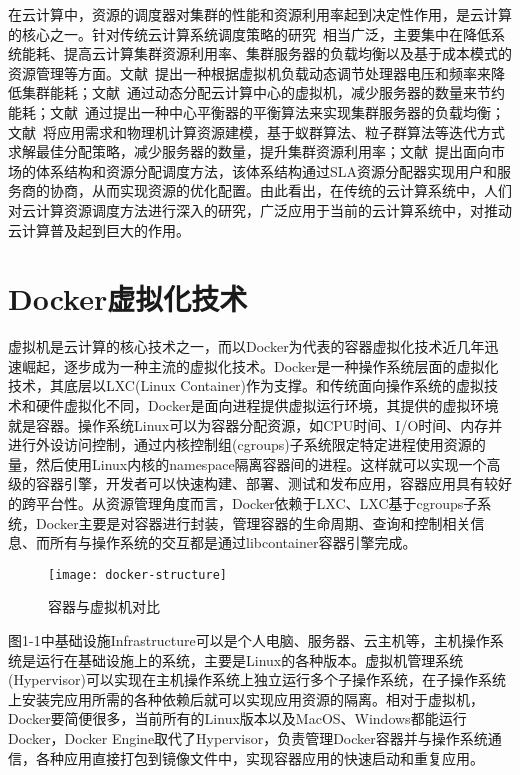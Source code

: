 在云计算中，资源的调度器对集群的性能和资源利用率起到决定性作用，是云计算的核心之一。针对传统云计算系统调度策略的研究~\cite{CloudSummarize}相当广泛，主要集中在降低系统能耗、提高云计算集群资源利用率、集群服务器的负载均衡以及基于成本模式的资源管理等方面。文献~提出一种根据虚拟机负载动态调节处理器电压和频率来降低集群能耗；文献~通过动态分配云计算中心的虚拟机，减少服务器的数量来节约能耗；文献~通过提出一种中心平衡器的平衡算法来实现集群服务器的负载均衡；文献~将应用需求和物理机计算资源建模，基于蚁群算法、粒子群算法等迭代方式求解最佳分配策略，减少服务器的数量，提升集群资源利用率；文献~提出面向市场的体系结构和资源分配调度方法，该体系结构通过SLA资源分配器实现用户和服务商的协商，从而实现资源的优化配置。由此看出，在传统的云计算系统中，人们对云计算资源调度方法进行深入的研究，广泛应用于当前的云计算系统中，对推动云计算普及起到巨大的作用。

\section{Docker虚拟化技术}
虚拟机是云计算的核心技术之一，而以Docker为代表的容器虚拟化技术近几年迅速崛起，逐步成为一种主流的虚拟化技术。Docker是一种操作系统层面的虚拟化技术，其底层以LXC(Linux Container)作为支撑。和传统面向操作系统的虚拟技术和硬件虚拟化不同，Docker是面向进程提供虚拟运行环境，其提供的虚拟环境就是容器。操作系统Linux可以为容器分配资源，如CPU时间、I/O时间、内存并进行外设访问控制，通过内核控制组(cgroups)子系统限定特定进程使用资源的量，然后使用Linux内核的namespace隔离容器间的进程。这样就可以实现一个高级的容器引擎，开发者可以快速构建、部署、测试和发布应用，容器应用具有较好的跨平台性。从资源管理角度而言，Docker依赖于LXC、LXC基于cgroups子系统，Docker主要是对容器进行封装，管理容器的生命周期、查询和控制相关信息、而所有与操作系统的交互都是通过libcontainer容器引擎完成。
\begin{figure}[H] %
	\centering
	\texttt{[image: docker-structure]}
	\caption{容器与虚拟机对比}
\end{figure}
图1-1中基础设施Infrastructure可以是个人电脑、服务器、云主机等，主机操作系统是运行在基础设施上的系统，主要是Linux的各种版本。虚拟机管理系统(Hypervisor)可以实现在主机操作系统上独立运行多个子操作系统，在子操作系统上安装完应用所需的各种依赖后就可以实现应用资源的隔离。相对于虚拟机，Docker要简便很多，当前所有的Linux版本以及MacOS、Windows都能运行Docker，Docker Engine取代了Hypervisor，负责管理Docker容器并与操作系统通信，各种应用直接打包到镜像文件中，实现容器应用的快速启动和重复应用。

